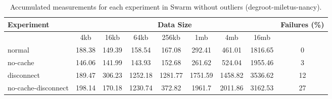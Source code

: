 \begin{table}[H]
\centering
\begin{small}
\caption{Accumulated measurements for each experiment in Swarm without outliers (degroot-miletus-nancy).}
\begin{tabular}{@{}lcccccccc@{}}
\toprule
Experiment    & \multicolumn{7}{c}{Data Size}          & Failures (\%) \\ \midrule
& 4kb  & 16kb  & 64kb  & 256kb  & 1mb  & 4mb  & 16mb              \\ \midrule
normal & 188.38 & 149.39 & 158.54 & 167.08 & 292.41 & 461.01 & 1816.65 & 0 \\
no-cache  & 146.06 & 141.99 & 143.93 & 152.68 & 261.62 & 524.04 & 1955.46 & 3 \\
disconnect  & 189.47 & 306.23 & 1252.18 & 1281.77 & 1751.59 & 1458.82 & 3536.62 & 12 \\
no-cache-disconnect  & 198.14 & 170.18 & 1230.74 & 372.82 & 1961.7 & 2011.86 & 3162.53 & 27 \\
\bottomrule
\end{tabular}
\end{small}
\end{table}


